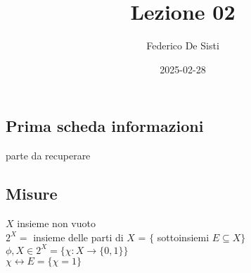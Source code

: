 \documentclass[12px]{article}
\title{Lezione 02}
\date{2025-02-28}
\author{Federico De Sisti}
\begin{document}
	\maketitle
	\newpage
	\subsection{Prima scheda informazioni}
	parte da recuperare\\
	\subsection{Misure}
	$X$ insieme non vuoto\\
	$2^X = $  insieme delle parti di  $X$ =  $\{$ sottoinsiemi $E\subseteq X\}$\\
	$\phi,X\in 2^X = \{\chi:X \rightarrow\{0,1\}\}$\\
	$\chi \leftrightarrow E = \{\chi = 1\}$\\
\end{document}
